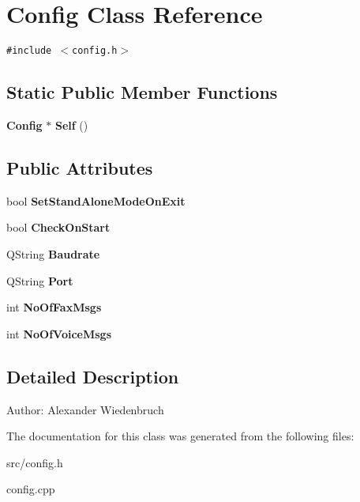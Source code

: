 \section{Config Class Reference}
\label{classConfig}
{\tt \#include $<$config.h$>$}

\subsection*{Static Public Member Functions}
\begin{CompactItemize}
\item 
{\bf Config} $\ast$ {\bf Self} ()\label{classConfig_e0}

\end{CompactItemize}
\subsection*{Public Attributes}
\begin{CompactItemize}
\item 
bool {\bf Set\-Stand\-Alone\-Mode\-On\-Exit}\label{classConfig_o0}

\item 
bool {\bf Check\-On\-Start}\label{classConfig_o1}

\item 
QString {\bf Baudrate}\label{classConfig_o2}

\item 
QString {\bf Port}\label{classConfig_o3}

\item 
int {\bf No\-Of\-Fax\-Msgs}\label{classConfig_o4}

\item 
int {\bf No\-Of\-Voice\-Msgs}\label{classConfig_o5}

\end{CompactItemize}


\subsection{Detailed Description}
\begin{Desc}
\item[Author:]Alexander Wiedenbruch \end{Desc}




The documentation for this class was generated from the following files:\begin{CompactItemize}
\item 
src/config.h\item 
config.cpp\end{CompactItemize}
